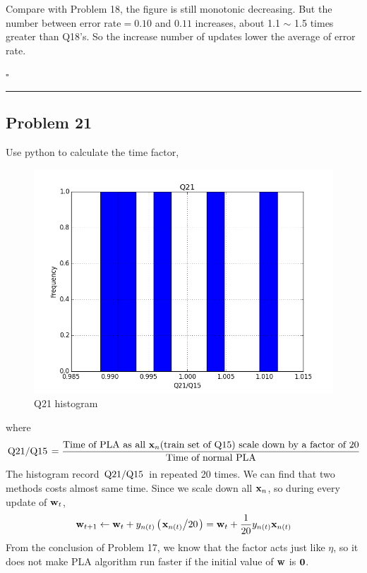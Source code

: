\documentclass[12pt]{article}
\newcommand*{\QEDB}{\hfill\ensuremath{\square}}
\newcommand{\ParTh}[1]{\left(#1\right)}
\newcommand{\BF}[1]{{\bf#1}}
\newcommand{\Divide}[2]{\left.#1\middle/#2\right.}
\newcommand{\horrule}[1]{\rule{\linewidth}{#1}}
\begin{document}
Compare with Problem 18, the figure is still monotonic decreasing. But the number between error rate$=0.10$ and $0.11$ increases, about 1.1 $\sim$ 1.5 times greater than Q18's. So the increase number of updates lower the average of error rate.

\QEDB

\horrule{0.5pt}

\subsection*{Problem 21}

Use python to calculate the time factor,
\begin{figure}[h]
\centering
\includegraphics[scale=0.3]{Q21}
\caption{Q21 histogram}
\label{Q21}
\end{figure}

where
\begin{align}
\Divide{\text{Q21}}{\text{Q15}}=\dfrac{\text{Time of PLA as all }\BF{x}_n\text{(train set of Q15) scale down by a factor of 20}}{\text{Time of normal PLA}}
\end{align}
The histogram record $\Divide{\text{Q21}}{\text{Q15}}$ in repeated 20 times. We can find that two methods costs almost same time. Since we scale down all $\BF{x}_n$, so during every update of $\BF{w}_t$,
\begin{align}
\BF{w}_{t+1}\leftarrow\BF{w}_t+y_{n\ParTh{t}}\ParTh{\Divide{\BF{x}_{n\ParTh{t}}}{20}}=\BF{w}_t+\dfrac{1}{20}y_{n\ParTh{t}}{{\BF{x}_{n\ParTh{t}}}}
\end{align}
From the conclusion of Problem 17, we know that the factor acts just like $\eta$, so it does not make PLA algorithm run faster if the initial value of $\BF{w}$ is $\BF{0}$.
\end{document}
